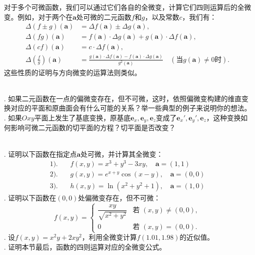 \documentclass[12pt,UTF8]{ctexbook}
\begin{document}
对于多个可微函数，我们可以通过它们各自的全微变，计算它们四则运算后的全微变。例如，对于两个在$\mathbf{a}$处可微的二元函数$f$和$g$，以及常数$c$，我们有：
\begin{align*}
    \Delta (f\pm g)(\mathbf{a}) &= \Delta f(\mathbf{a}) \pm \Delta g(\mathbf{a}), \\
    \Delta (fg)(\mathbf{a}) &= f(\mathbf{a})\cdot \Delta g(\mathbf{a}) + g(\mathbf{a})\cdot \Delta f(\mathbf{a}), \\
    \Delta(cf)(\mathbf{a}) &= c\cdot \Delta f(\mathbf{a}), \\
    \Delta\left(\frac{f}{g}\right)(\mathbf{a}) &= \frac{g(\mathbf{a})\cdot \Delta f(\mathbf{a}) - f(\mathbf{a})\cdot \Delta g(\mathbf{a})}{g^2(\mathbf{a})} \quad \left(\mbox{当}g(\mathbf{a})\neq 0\mbox{时}\right).
\end{align*}
这些性质的证明与方向微变的运算法则类似。

\begin{sk}
\mbox{}\\
. 如果二元函数在一点的偏微变存在，但不可微，这时，依照偏微变构建的维直变换对应的平面和原曲面会有什么可能的关系？举一些典型的例子来说明你的想法。\\
. 如果$Oxy$平面上发生了基底变换，原基底$\mathbf{e}_x, \mathbf{e}_y, \mathbf{e}_z$变成了$\mathbf{e}_x', \mathbf{e}_y', \mathbf{e}_z$，这种变换如何影响可微二元函数的切平面的方程？切平面是否改变？
\end{sk}

\begin{xt}
    \mbox{}\\
    . 证明以下函数在指定点$\mathbf{a}$处可微，并计算其全微变：
    \begin{align*}
    1).& \quad f(x,y) = x^3 + y^3 - 3xy, \quad \mathbf{a} = (1,1) \\
    2).& \quad g(x,y) = e^{x+y}\cos(x-y), \quad \mathbf{a} = (0,0) \\
    3).& \quad h(x,y) = \ln(x^2+y^2+1), \quad \mathbf{a} = (1,0)
    \end{align*}
    . 证明以下函数在$(0,0)$处偏微变存在，但不可微：
    $$ f(x,y) = \begin{cases}
    \dfrac{xy}{\sqrt{x^2+y^2}} & \text{若 } (x,y)\neq(0,0), \\
    0 & \text{若 } (x,y)=(0,0).
    \end{cases} $$
    . 设$f(x,y) = x^2y + 2xy^2$，利用全微变计算$f(1.01,1.98)$的近似值。\\
    . 证明本节最后，函数的四则运算对应的全微变公式。
\end{xt}
\end{document}
